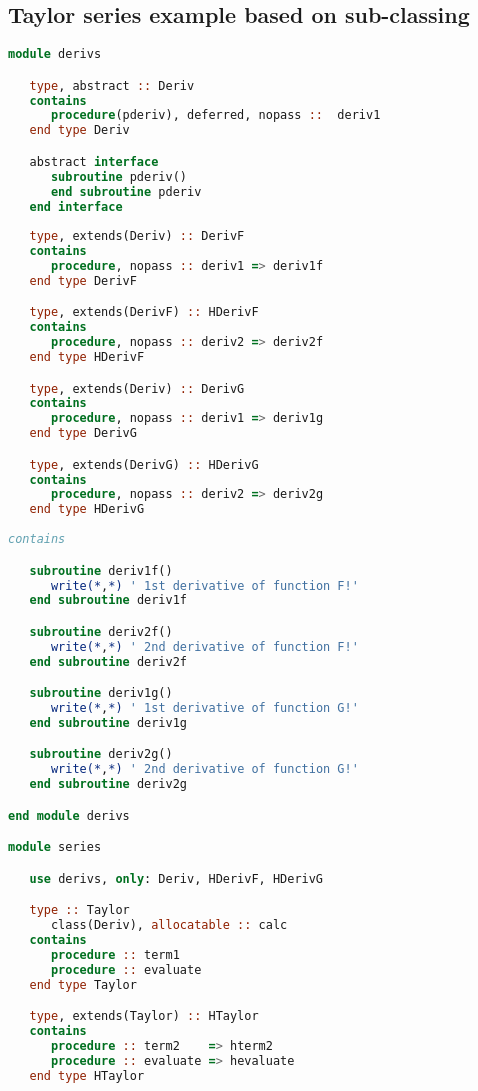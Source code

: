 \documentclass[11pt,oneside]{article}
\begin{document}
\lstset{style=mystyle}


\begin{appendices}

\section{Taylor series example based on sub-classing}
\label{sect:example1}

\begin{lstlisting}[language=Fortran]
module derivs

   type, abstract :: Deriv
   contains
      procedure(pderiv), deferred, nopass ::  deriv1
   end type Deriv

   abstract interface
      subroutine pderiv()
      end subroutine pderiv      
   end interface
   
   type, extends(Deriv) :: DerivF
   contains
      procedure, nopass :: deriv1 => deriv1f
   end type DerivF

   type, extends(DerivF) :: HDerivF
   contains
      procedure, nopass :: deriv2 => deriv2f
   end type HDerivF

   type, extends(Deriv) :: DerivG
   contains
      procedure, nopass :: deriv1 => deriv1g
   end type DerivG

   type, extends(DerivG) :: HDerivG
   contains
      procedure, nopass :: deriv2 => deriv2g
   end type HDerivG
   
contains

   subroutine deriv1f()
      write(*,*) ' 1st derivative of function F!'
   end subroutine deriv1f

   subroutine deriv2f()
      write(*,*) ' 2nd derivative of function F!'
   end subroutine deriv2f

   subroutine deriv1g()
      write(*,*) ' 1st derivative of function G!'
   end subroutine deriv1g

   subroutine deriv2g()
      write(*,*) ' 2nd derivative of function G!'
   end subroutine deriv2g

end module derivs

module series

   use derivs, only: Deriv, HDerivF, HDerivG

   type :: Taylor
      class(Deriv), allocatable :: calc
   contains
      procedure :: term1
      procedure :: evaluate
   end type Taylor

   type, extends(Taylor) :: HTaylor
   contains
      procedure :: term2    => hterm2
      procedure :: evaluate => hevaluate
   end type HTaylor


\end{lstlisting}
\end{appendices}
\end{document}

